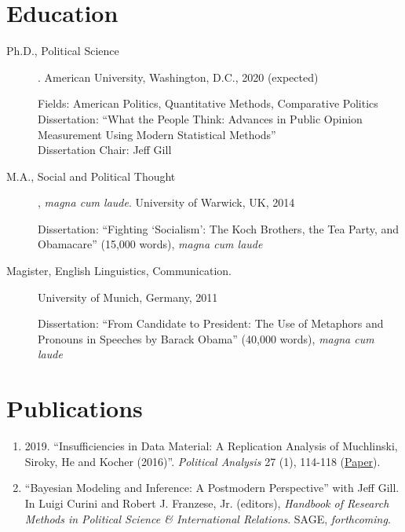\documentclass[11pt]{article}
\begin{document}
\begin{flushleft}

\section*{Education}

\begin{description}
\item[{\sc Ph.D.}, Political Science]\hspace{-0.175cm}. American University,
Washington, D.C., 2020 (expected) \par
Fields: American Politics, Quantitative Methods, Comparative Politics \\ 
Dissertation: ``What the People Think: Advances in Public Opinion Measurement Using Modern Statistical Methods''\\
Dissertation Chair: Jeff Gill\\
\end{description}

\begin{description}
\item[{\sc M.A.}, Social and Political Thought]\hspace{-0.175cm}, \textit{magna cum laude}. University of Warwick, UK, 2014 \par
Dissertation: ``Fighting `Socialism': The Koch Brothers, the Tea Party, and Obamacare'' (15,000 words), \textit{magna cum laude} \\
\end{description}

\begin{description}
\item[{\sc Magister}, English Linguistics, Communication.] University of Munich, Germany, 2011 \par
Dissertation: ``From Candidate to President: The Use of Metaphors and Pronouns in Speeches by Barack Obama'' (40,000 words), \textit{magna cum laude} \\
\end{description}


\section*{Publications}
\begin{enumerate}[leftmargin=!,labelindent=20pt,itemindent=-20pt]
\item[] 2019. ``Insufficiencies in Data Material: A Replication Analysis of Muchlinski, Siroky, He and Kocher (2016)''. \textit{Political Analysis} 27 (1), 114-118 (\href{https://www.simonheuberger.com/files/research/2019_pa_insufficiencies_in_data_material.pdf}{Paper}).
\vspace{-0.27cm}
\item[] ``Bayesian Modeling and Inference: A Postmodern Perspective'' with Jeff Gill. In Luigi Curini and Robert J. Franzese, Jr. (editors), \textit{Handbook of Research Methods in Political Science \& International Relations}. SAGE, \textit{forthcoming}.
\end{enumerate}



\end{flushleft}
\end{document}
